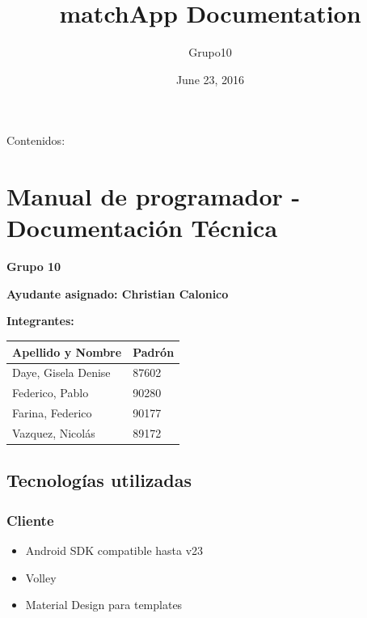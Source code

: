 \documentclass[letterpaper,10pt,english]{sphinxmanual}
\title{matchApp Documentation}
\date{June 23, 2016}
\author{Grupo10}
\begin{document}
\maketitle
\tableofcontents
{}\label{index::doc}


Contenidos:


\chapter{Manual de programador - Documentación Técnica}
\label{manuals::doc}\label{manuals:manual-de-programador-documentacion-tecnica}\label{manuals:documentacion-de-matchapp}
\textbf{Grupo 10}

\textbf{Ayudante asignado: Christian Calonico}

\textbf{Integrantes:}

\begin{tabulary}{\linewidth}{|L|L|}
\hline
\textsf{\relax 
Apellido y Nombre
} & \textsf{\relax 
Padrón
}\\
\hline
Daye, Gisela Denise
 & 
87602
\\
\hline
Federico, Pablo
 & 
90280
\\
\hline
Farina, Federico
 & 
90177
\\
\hline
Vazquez, Nicolás
 & 
89172
\\
\hline\end{tabulary}



\section{Tecnologías utilizadas}
\label{manuals:tecnologias-utilizadas}

\subsection{Cliente}
\label{manuals:cliente}\begin{itemize}
\item {} 
Android SDK compatible hasta v23

\item {} 
Volley

\item {} 
Material Design para templates

\end{itemize}
\end{document}
